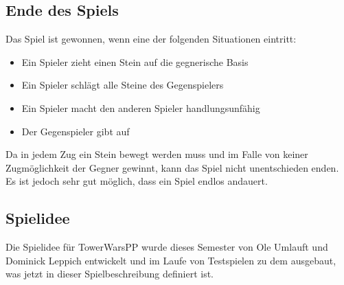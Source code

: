 \subsection*{Ende des Spiels}
Das Spiel ist gewonnen, wenn eine der folgenden Situationen eintritt:
\begin{itemize}
\item Ein Spieler zieht einen Stein auf die gegnerische Basis
\item Ein Spieler schlägt alle Steine des Gegenspielers
\item Ein Spieler macht den anderen Spieler handlungsunfähig
\item Der Gegenspieler gibt auf
\end{itemize}

Da in jedem Zug ein Stein bewegt werden muss und im Falle von keiner Zugmöglichkeit der Gegner gewinnt, kann das Spiel nicht unentschieden enden. Es ist jedoch sehr gut möglich, dass ein Spiel endlos andauert.

\subsection*{Spielidee}
Die Spielidee für TowerWarsPP wurde dieses Semester von Ole Umlauft und Dominick Leppich entwickelt und im Laufe von Testspielen zu dem ausgebaut, was jetzt in dieser Spielbeschreibung definiert ist.